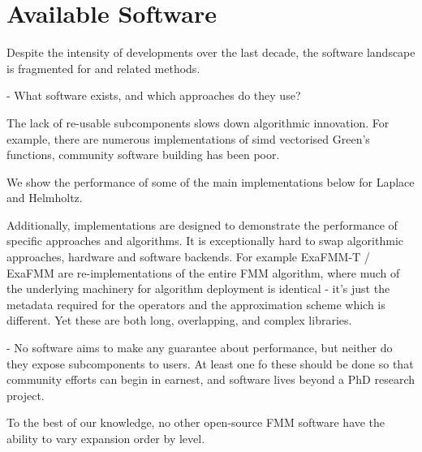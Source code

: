 
\section{Available Software}\label{chpt:fmm:sec:software}

Despite the intensity of developments over the last decade, the software landscape is fragmented for  and related methods.

- What software exists, and which approaches do they use?

The lack of re-usable subcomponents slows down algorithmic innovation. For example, there are numerous implementations of \acrshort{simd} vectorised Green's functions, community software building has been poor.

We show the performance of some of the main implementations below for Laplace and Helmholtz.

Additionally, implementations are designed to demonstrate the performance of specific approaches and algorithms. It is exceptionally hard to swap algorithmic approaches, hardware and software backends. For example ExaFMM-T / ExaFMM are re-implementations of the entire FMM algorithm, where much of the underlying machinery for algorithm deployment is identical - it's just the metadata required for the operators and the approximation scheme which is different. Yet these are both long, overlapping, and complex libraries.

- No software aims to make any guarantee about performance, but neither do they expose subcomponents to users. At least one fo these should be done so that community efforts can begin in earnest, and software lives beyond a PhD research project.

To the best of our knowledge, no other open-source FMM software have the ability to vary expansion order by level.

